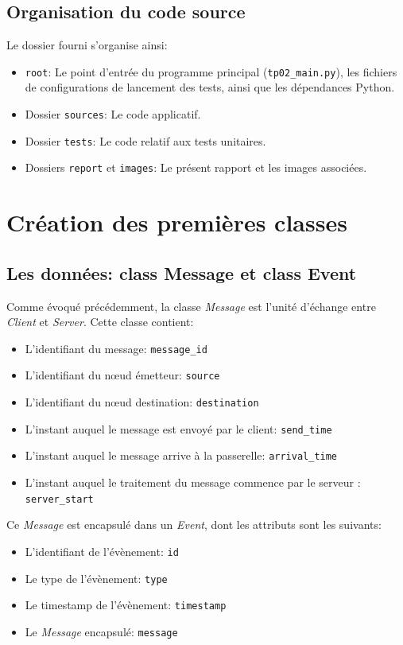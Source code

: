 \documentclass[11pt,a4paper]{article}
\begin{document}
\bigskip
\subsection{Organisation du code source}

Le dossier fourni s'organise ainsi:
\begin{itemize}
    \item \lstinline|root|: Le point d'entrée du programme principal (\lstinline|tp02_main.py|), les fichiers de configurations de lancement des tests, ainsi que les dépendances Python.
    \item Dossier \lstinline|sources|: Le code applicatif.
    \item Dossier \lstinline|tests|: Le code relatif aux tests unitaires.
    \item Dossiers \lstinline|report| et \lstinline|images|: Le présent rapport et les images associées.
\end{itemize}

\bigskip
\bigskip
\bigskip
\bigskip

\section{Création des premières classes}
\subsection{Les données: class Message et class Event}
Comme évoqué précédemment, la classe \emph{Message} est l'unité d'échange entre \emph{Client} et \emph{Server}.
Cette classe contient:
\begin{itemize}
    \item L'identifiant du message: \lstinline|message_id|
    \item L'identifiant du nœud émetteur: \lstinline|source|
    \item L'identifiant du nœud destination: \lstinline|destination|
    \item L'instant auquel le message est envoyé par le client: \lstinline|send_time|
    \item L'instant auquel le message arrive à la passerelle: \lstinline|arrival_time|
    \item L'instant auquel le traitement du message commence par le serveur : \lstinline|server_start|
\end{itemize}

Ce \emph{Message} est encapsulé dans un \emph{Event}, dont les attributs sont les suivants:
\begin{itemize}
    \item L'identifiant de l'évènement: \lstinline|id|
    \item Le type de l'évènement: \lstinline|type|
    \item Le timestamp de l'évènement: \lstinline|timestamp|
    \item Le \emph{Message} encapsulé: \lstinline|message|
\end{itemize}
\end{document}
